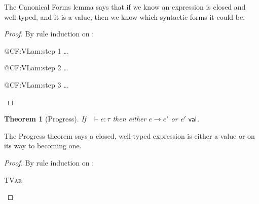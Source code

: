 \documentclass{article}
\def\TVar{\textsc{TVar}}
\def\VLam{\textsc{VLam}}
\def\VNum{\textsc{VNum}}
\newcommand\hastype[3][\Gamma]{#1 \vdash #2 : #3}
\newcommand\isval[1]{#1~\mathsf{\normalfont val}}
\def\smallstep{\longrightarrow}
\newcommand\subst[3]{[#1/#2]#3}
\newtheorem{Theorem}{Theorem}
\newtheorem{Lemma}[Theorem]{Lemma}
\begin{document}
The Canonical Forms lemma says that
  if we know an expression is closed and well-typed,
  and it is a value,
  then we know which syntactic forms it could be.

\begin{proof}
  By rule induction on :
  \begin{byCases}
    \case{\VLam}
      \begin{pfsteps}
        \item @{CF:VLam:step 1} \ldots
        \item @{CF:VLam:step 2} \ldots
        \item @{CF:VLam:step 3} \ldots    {}
      \end{pfsteps}
    \case{\VNum}
  \end{byCases}
\end{proof}







\begin{Theorem}[Progress]
  \label{theorem:Progress}
  If ~$\hastype[]{e}{\tau}$
  then either $e \smallstep e'$
  or $\isval{e'}$.
\end{Theorem}

The Progress theorem says a closed, well-typed expression is either a value or on its way to becoming one.

\begin{proof}
  By rule induction on :
  \begin{byCases}
    \item[\TVar]
  \end{byCases}
\end{proof}
\end{document}
